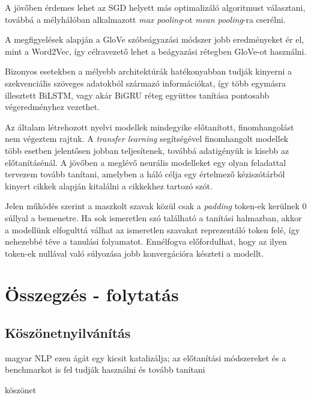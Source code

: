 A jövőben érdemes lehet az SGD helyett más optimalizáló algoritmust választani, továbbá a mélyhálóban alkalmazott \textit{max pooling}-ot \textit{mean pooling}-ra cserélni.

A megfigyelések alapján a GloVe szóbeágyazási módszer jobb eredményeket ér el, mint a Word2Vec, így célravezető lehet a beágyazási rétegben GloVe-ot használni.

Bizonyos esetekben a mélyebb architektúrák hatékonyabban tudják kinyerni a szekvenciális szöveges adatokból származó információkat, így több egymásra illesztett BiLSTM, vagy akár BiGRU réteg együttes tanítása pontosabb végeredményhez vezethet.

Az általam létrehozott nyelvi modellek mindegyike előtanított, finomhangolást nem végeztem rajtuk. A \textit{transfer learning} segítségével finomhangolt modellek több esetben jelentősen jobban teljesítenek, továbbá adatigényük is kisebb az előtanításénál. A jövőben a meglévő neurális modelleket egy olyan feladattal tervezem tovább tanítani, amelyben a háló célja egy értelmező kéziszótárból kinyert cikkek alapján kitalálni a cikkekhez tartozó szót.

Jelen működés szerint a maszkolt szavak közül csak a \textit{padding} token-ek kerülnek 0 súllyal a bemenetre. Ha sok ismeretlen szó található a tanítási halmazban, akkor a modellünk elfogulttá válhat az ismeretlen szavakat reprezentáló token felé, így nehezebbé téve a tanulási folyamatot. Ennélfogva előfordulhat, hogy az ilyen token-ek nullával való súlyozása jobb konvergációra készteti a modellt.

\chapter*{Összegzés - folytatás}

\section{Köszönetnyilvánítás}

magyar NLP ezen ágát egy kicsit katalizálja; az előtanítási módszereket és a benchmarkot is fel tudják használni és tovább tanítani

köszönet